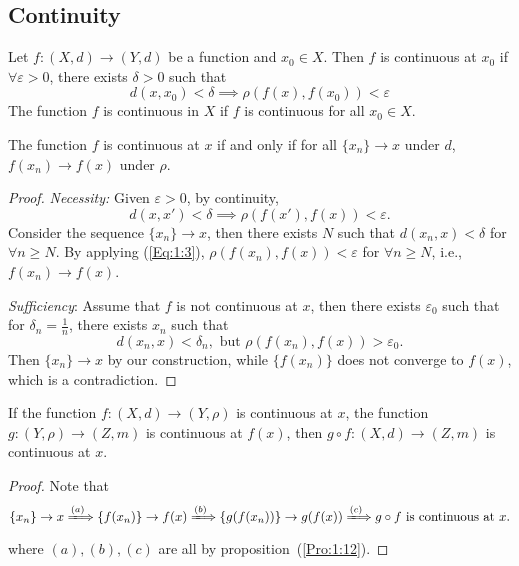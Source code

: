 \subsection{Continuity}
\begin{definition}[Continuity]
Let $f:(X,d)\to(Y,d)$ be a function and $x_0\in X$. Then $f$ is continuous at $x_0$ if 
$\forall\varepsilon>0$, there exists $\delta>0$ such that
\[
d(x,x_0)<\delta\implies
\rho(f(x),f(x_0))<\varepsilon
\]
The function $f$ is continuous in $X$ if $f$ is continuous for all $x_0\in X$.
\end{definition}
\begin{proposition}\label{Pro:1:12}
The function $f$ is continuous at $x$ if and only if for all $\{x_n\}\to x$ under $d$, $f(x_n)\to f(x)$ under $\rho$.
\end{proposition}
\begin{proof}
\textit{Necessity:}
Given $\varepsilon>0$, by continuity, 
\begin{equation}\label{Eq:1:3}
d(x,x')<\delta\implies \rho(f(x'),f(x))<\varepsilon.
\end{equation}
Consider the sequence $\{x_n\}\to x$, then there exists $N$ such that $d(x_n,x)<\delta$ for $\forall n\ge N$. By applying (\ref{Eq:1:3}), $\rho(f(x_n),f(x))<\varepsilon$ for $\forall n\ge N$, i.e., $f(x_n)\to f(x)$.

\textit{Sufficiency}:
Assume that $f$ is not continuous at $x$, then there exists $\varepsilon_0$ such that for $\delta_n=\frac{1}{n}$, there exists $x_n$ such that
\[
d(x_n,x)<\delta_n,\mbox{ but }\rho(f(x_n),f(x))>\varepsilon_0.
\]
Then $\{x_n\}\to x$ by our construction, while $\{f(x_n)\}$ does not converge to $f(x)$, which is a contradiction.
\end{proof}
\begin{corollary}
If the function $f:(X,d)\to(Y,\rho)$ is continuous at $x$, the function $g:(Y,\rho)\to(Z,m)$ is continuous at $f(x)$,
then $g\circ f:(X,d)\to(Z,m)$ is continuous at $x$.
\end{corollary}
\begin{proof}
Note that
\[
\{x_n\}\to x
\xLongrightarrow{(a)}
\{f(x_n)\}\to f(x)
\xLongrightarrow{(b)}
\{g(f(x_n))\}\to g(f(x))
\xLongrightarrow{(c)}
g\circ f\mbox{ is continuous at $x$}.
\]
where $(a),(b),(c)$ are all by proposition~(\ref{Pro:1:12}).
\end{proof}
